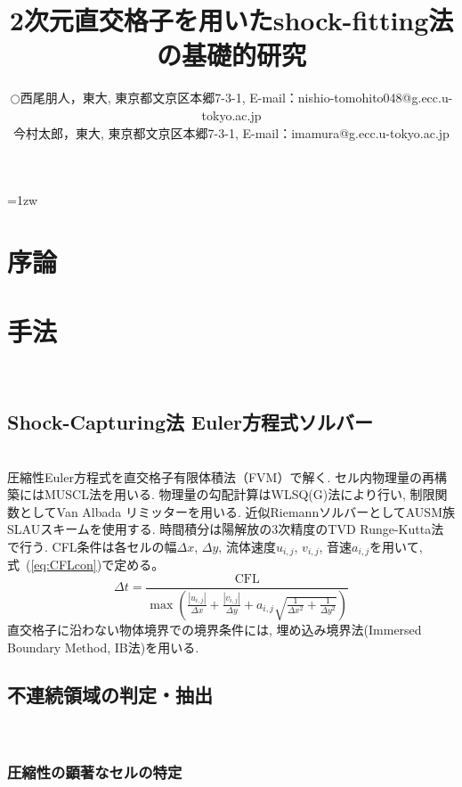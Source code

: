 \documentclass[a4j]{jarticle}
\title{2次元直交格子を用いたshock-fitting法の基礎的研究}   %
\author{\begin{tabular}{cl}
$\bigcirc$ & 西尾朋人，東大, 
             東京都文京区本郷7-3-1, 
             E-mail：nishio-tomohito048@g.ecc.u-tokyo.ac.jp \\
           & 今村太郎，東大,
             東京都文京区本郷7-3-1, 
             E-mail：imamura@g.ecc.u-tokyo.ac.jp
\end{tabular} }
\begin{document}
\baselineskip=1zw
\maketitle

\section{序論} \label{sec:intro}

\section{手法} \label{sec:method}
\mbox{}\\[-5.0ex]
\subsection{Shock-Capturing法 Euler方程式ソルバー} \label{subsec:sc}
\mbox{}\\[-3.0ex]

圧縮性Euler方程式を直交格子有限体積法（FVM）で解く.
セル内物理量の再構築にはMUSCL法を用いる.
物理量の勾配計算はWLSQ(G)法により行い, 制限関数としてVan Albada リミッターを用いる.
近似RiemannソルバーとしてAUSM族 SLAUスキームを使用する.
時間積分は陽解放の3次精度のTVD Runge-Kutta法で行う.
CFL条件は各セルの幅$\Delta x$, $\Delta y$, 流体速度$u_{i,j}$, $v_{i,j}$, 音速$a_{i, j}$を用いて, 式~(\ref{eq:CFLcon})で定める。
\begin{equation}
    \Delta t =
    \frac{\mathrm{CFL}}{
        \max\left(
            \frac{|u_{i,j}|}{\Delta x}
            + \frac{|v_{i,j}|}{\Delta y}
            + a_{i,j}
              \sqrt{
                \frac{1}{\Delta x^2}
                + \frac{1}{\Delta y^2}
              }
        \right)
    }
    \label{eq:CFLcon}
\end{equation}
直交格子に沿わない物体境界での境界条件には, 埋め込み境界法(Immersed Boundary Method, IB法)を用いる.

\subsection{不連続領域の判定・抽出} \label{subsec:discon}
\mbox{}\\[-7.0ex]
\subsubsection{圧縮性の顕著なセルの特定} \label{subsubsec:comp}
\mbox{}\\[-1.0ex]
\end{document}
